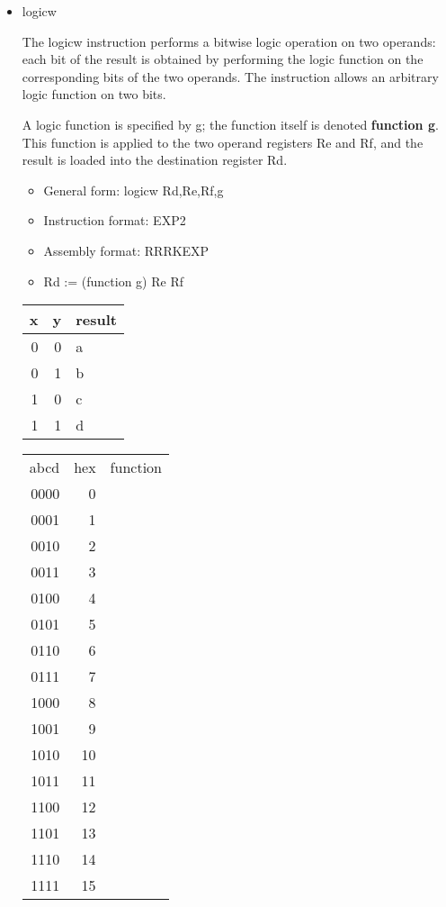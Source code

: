 \documentclass[11pt]{article}
\begin{document}
\begin{itemize}
\item logicw
\label{sec:org1fe3b0f}

The logicw instruction performs a bitwise logic operation on two
operands: each bit of the result is obtained by performing the logic
function on the corresponding bits of the two operands.  The
instruction allows an arbitrary logic function on two bits.

A logic function is specified by g; the function itself is denoted
\textbf{function g}.  This function is applied to the two operand registers
Re and Rf, and the result is loaded into the destination register Rd.

\begin{itemize}
\item General form: logicw Rd,Re,Rf,g
\item Instruction format: EXP2
\item Assembly format: RRRKEXP
\item Rd := (function g) Re Rf
\end{itemize}

\begin{center}
\begin{tabular}{rrl}
x & y & result\\
\hline
0 & 0 & a\\
0 & 1 & b\\
1 & 0 & c\\
1 & 1 & d\\
\end{tabular}
\end{center}


\begin{center}
\begin{tabular}{rrl}
abcd & hex & function\\
0000 & 0 & \\
0001 & 1 & \\
0010 & 2 & \\
0011 & 3 & \\
0100 & 4 & \\
0101 & 5 & \\
0110 & 6 & \\
0111 & 7 & \\
1000 & 8 & \\
1001 & 9 & \\
1010 & 10 & \\
1011 & 11 & \\
1100 & 12 & \\
1101 & 13 & \\
1110 & 14 & \\
1111 & 15 & \\
\end{tabular}
\end{center}



\end{itemize}
\end{document}
